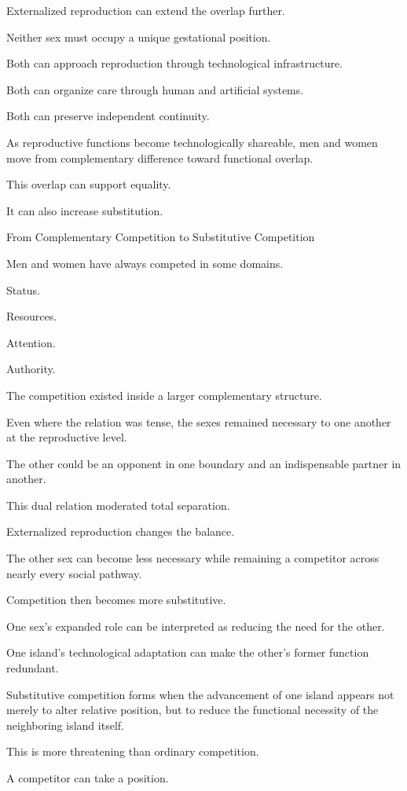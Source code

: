 Externalized reproduction can extend the overlap further.

Neither sex must occupy a unique gestational position.

Both can approach reproduction through technological infrastructure.

Both can organize care through human and artificial systems.

Both can preserve independent continuity.

As reproductive functions become technologically shareable, men and women move from complementary difference toward functional overlap.

This overlap can support equality.

It can also increase substitution.

From Complementary Competition to Substitutive Competition

Men and women have always competed in some domains.

Status.

Resources.

Attention.

Authority.

The competition existed inside a larger complementary structure.

Even where the relation was tense, the sexes remained necessary to one another at the reproductive level.

The other could be an opponent in one boundary and an indispensable partner in another.

This dual relation moderated total separation.

Externalized reproduction changes the balance.

The other sex can become less necessary while remaining a competitor across nearly every social pathway.

Competition then becomes more substitutive.

One sex’s expanded role can be interpreted as reducing the need for the other.

One island’s technological adaptation can make the other’s former function redundant.

Substitutive competition forms when the advancement of one island appears not merely to alter relative position, but to reduce the functional necessity of the neighboring island itself.

This is more threatening than ordinary competition.

A competitor can take a position.

